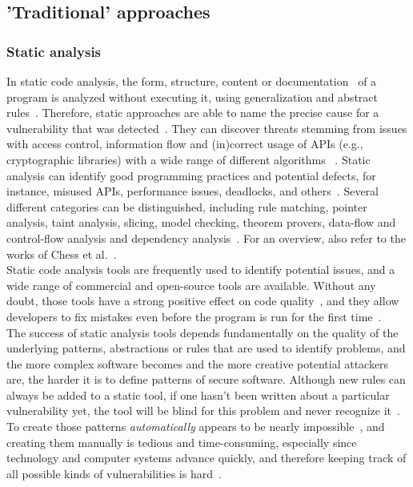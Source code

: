 \documentclass[
a4paper,
pagesize,
pdftex,
12pt,
twoside, %
BCOR=5mm, %
ngerman,
fleqn,
final,
]{scrartcl}
\begin{document}
	\subsection{'Traditional' approaches}
	\subsubsection{Static analysis}
	In static code analysis, the form, structure, content or documentation~\cite{Liu.2012} of a program is analyzed without executing it, using generalization and abstract rules~\cite{Ghaffarian.2017}. Therefore, static approaches are able to name the precise cause for a vulnerability that was detected~\cite{Gupta.2014}. They can discover threats stemming from issues with access control, information flow and (in)correct usage of APIs (e.g., cryptographic libraries) with a wide range of different algorithms ~\cite{Pistoia.2007}. Static analysis can identify good programming practices and potential defects, for instance, misused APIs, performance issues, deadlocks, and others~\cite{Venkatasubramanyam.2014}. Several different categories can be distinguished, including rule matching, pointer analysis, taint analysis, slicing, model checking, theorem provers, data-flow and control-flow analysis and dependency analysis~\cite{Gupta.2014,Liu.2012}. For an overview, also refer to the works of Chess et al.~\cite{Chess.2004}.\\
	Static code analysis tools are frequently used to identify potential issues, and a wide range of commercial and open-source tools are available. Without any doubt, those tools have a strong positive effect on code quality~\cite{Liu.2018}, and they allow developers to fix mistakes even before the program is run for the first time~\cite{Gupta.2014}. \\
	The success of static analysis tools depends fundamentally on the quality of the underlying patterns, abstractions or rules that are used to identify problems, and the more complex software becomes and the more creative potential attackers are, the harder it is to define patterns of secure software. Although new rules can always be added to a static tool, if one hasn't been written about a particular vulnerability yet, the tool will be blind for this problem and never recognize it~\cite{Chess.2004}. To create those patterns \textit{automatically} appears to be nearly impossible~\cite{Rolim.2018, Yamaguchi.2012}, and creating them manually is tedious and time-consuming, especially since technology and computer systems advance quickly, and therefore keeping track of all possible kinds of vulnerabilities is hard~\cite{Ma.2017}.\\
\end{document}
